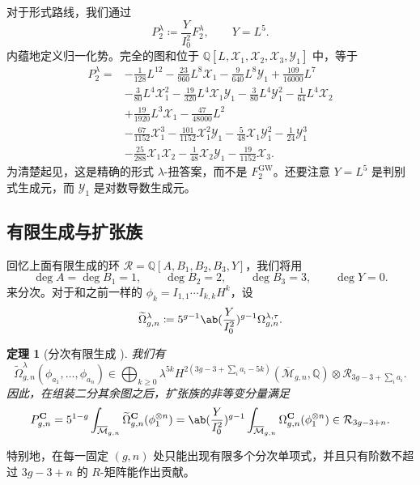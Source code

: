 \documentclass{amsart}
\newtheorem{thm}{定理}[section]
\theoremstyle{definition}
\theoremstyle{remark}
\theoremstyle{plain}
\theoremstyle{definition}
\theoremstyle{remark}
\newcommand{\Q}{\mathbb{Q}}
\newcommand{\Mbar}{\overline{\mathcal{M}}}
\newcommand{\mc}[1]{\mathcal{#1}}
\newcommand{\mbf}[1]{\mathbf{#1}}
\newcommand{\mr}[1]{\mathrm{#1}}
\newcommand{\wt}[1]{\widetilde{#1}}
\newcommand{\1}{\mathbf{1}}
\newcommand{\2}{\mathbf{2}}
\newcommand{\3}{\mathbf{3}}
\begin{document}
对于形式路线，我们通过
\[ P_2^{\lambda} \coloneqq \frac{Y}{I_0^2}F_2^{\lambda}, \qquad Y = L^5. \]
内蕴地定义归一化势。完全的图和位于 \(\Q[L,\mc{X}_1,\mc{X}_2,\mc{X}_3,\mc{Y}_1]\) 中，等于
\begin{align*}
    P_2^{\lambda} ={}& -\frac{1}{128}L^{12} - \frac{23}{960}L^8\mc{X}_1 - \frac{9}{640}L^8\mc{Y}_1 + \frac{109}{16000}L^7 \\
    &- \frac{3}{80}L^4\mc{X}_1^2 - \frac{19}{320}L^4\mc{X}_1\mc{Y}_1 - \frac{3}{80}L^4\mc{Y}_1^2 - \frac{1}{64}L^4\mc{X}_2 \\
    &+ \frac{19}{1920}L^3\mc{X}_1 - \frac{47}{48000}L^2 \\
    &- \frac{67}{1152}\mc{X}_1^3 - \frac{101}{1152}\mc{X}_1^2\mc{Y}_1 - \frac{5}{48}\mc{X}_1\mc{Y}_1^2 - \frac{1}{24}\mc{Y}_1^3 \\
    &- \frac{25}{288}\mc{X}_1\mc{X}_2 - \frac{1}{48}\mc{X}_2\mc{Y}_1 - \frac{19}{1152}\mc{X}_3.
\end{align*}
为清楚起见，这是精确的形式 \(\lambda\)-扭答案，而不是 \(F_2^{\mr{GW}}\)。还要注意 \(Y = L^5\) 是判别式生成元，而 \(\mc{Y}_1\) 是对数导数生成元。

\subsection{有限生成与扩张族}%
\label{sub:Finite generation and the extended family}

回忆上面有限生成的环 \(\mc{R} = \Q[A,B_1,B_2,B_3,Y]\)，我们将用
\[ \deg A = \deg B_1 = 1, \qquad \deg B_2 = 2, \qquad \deg B_3 = 3, \qquad \deg Y = 0. \]
来分次。对于和之前一样的 \(\phi_k = I_{1,1}\cdots I_{k,k}H^k\)，设
\[ \wt{\Omega}^{\lambda}_{g,n} \coloneqq 5^{g-1}\ab(\frac{Y}{I_0^2})^{g-1}\Omega^{\lambda,\tau}_{g,n}. \]

\begin{thm}[分次有限生成 {\cite{GJRstructure}}]%
\label{thm:graded finite generation}
    我们有
    \[ \wt{\Omega}^{\lambda}_{g,n}(\phi_{a_1}, \ldots, \phi_{a_n}) \in \bigoplus_{k \geq 0}\lambda^{5k}H^{2(3g-3+\sum_i a_i - 5k)}(\Mbar_{g,n},\Q)\otimes \mc{R}_{3g-3+\sum_i a_i}. \]
    因此，在组装二分其余图之后，扩张族的非等变分量满足
    \[ P^{\mbf{C}}_{g,n} = 5^{1-g}\int_{\Mbar_{g,n}}\wt{\Omega}^{\mbf{C}}_{g,n}(\phi_1^{\otimes n}) = \ab( \frac{Y}{I_0^2})^{g-1}\int_{\Mbar_{g,n}}\Omega^{\mbf{C}}_{g,n}(\phi_1^{\otimes n}) \in \mc{R}_{3g-3+n}. \]
\end{thm}

特别地，在每一固定 \((g,n)\) 处只能出现有限多个分次单项式，并且只有阶数不超过 \(3g-3+n\) 的 \(R\)-矩阵能作出贡献。
\end{document}
